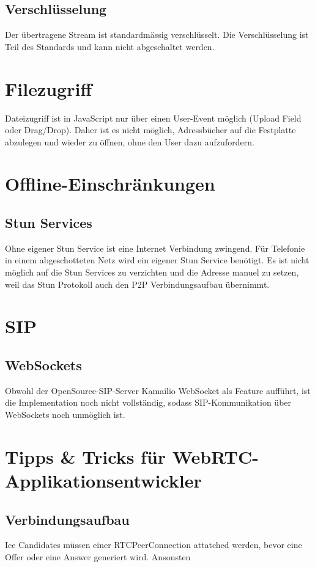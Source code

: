 		\subsection{Verschlüsselung}
			Der übertragene Stream ist standardmässig verschlüsselt. Die Verschlüsselung ist Teil des Standards und kann nicht abgeschaltet werden.
	 	
	 
	 \section{Filezugriff}
	 	Dateizugriff ist in JavaScript nur über einen User-Event möglich (Upload
	 	Field oder Drag/Drop). Daher ist es nicht möglich, Adressbücher auf die
	 	Festplatte abzulegen und wieder zu öffnen, ohne den User dazu aufzufordern.
	 	
	 
	 \section{Offline-Einschränkungen}
	 	\subsection{Stun Services}
			Ohne eigener Stun Service ist eine Internet Verbindung zwingend. Für Telefonie in einem abgeschotteten Netz wird ein eigener Stun Service benötigt. Es ist nicht möglich auf die Stun Services zu verzichten und die Adresse manuel zu setzen, weil das Stun Protokoll auch den P2P Verbindungsaufbau übernimmt.
	 	
	 		
	 \section{SIP}
	 	\subsection{WebSockets}
	 		Obwohl der OpenSource-SIP-Server Kamailio WebSocket als Feature aufführt,
	 		ist die Implementation noch nicht vollständig, sodass SIP-Kommunikation über
	 		WebSockets noch unmöglich ist.


	\section{Tipps \& Tricks für WebRTC-Applikationsentwickler}
		\subsection{Verbindungsaufbau}
			Ice Candidates müssen einer RTCPeerConnection attatched werden, bevor eine Offer oder eine Answer generiert wird. Ansonsten